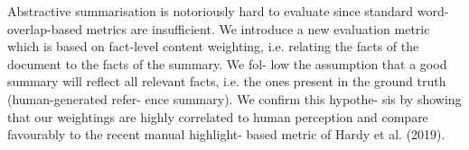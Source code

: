Abstractive summarisation is notoriously hard to evaluate since standard word-overlap-based metrics are insufficient. We introduce a new evaluation metric which is based on fact-level content weighting, i.e. relating the facts of the document to the facts of the summary. We fol- low the assumption that a good summary will reflect all relevant facts, i.e. the ones present in the ground truth (human-generated refer- ence summary). We confirm this hypothe- sis by showing that our weightings are highly correlated to human perception and compare favourably to the recent manual highlight- based metric of Hardy et al. (2019).
